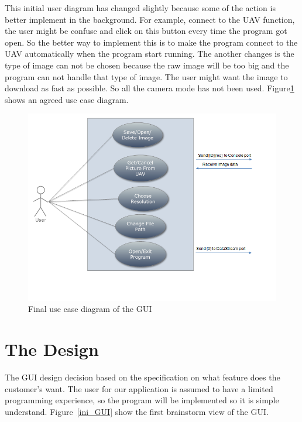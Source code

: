 This initial user diagram has changed slightly because some of the action is better implement in the background. For example, connect to the UAV function, the user might be confuse and click on this button every time the program got open. So the better way to implement this is to make the program connect to the UAV automatically when the program start running. 
The another changes is the type of image can not be chosen because the raw image will be too big and the program can not handle that type of image.
The user might want the image to download as fast as possible. So all the camera mode has not been used.
Figure\ref{GUI_finalUseCase} shows an agreed use case diagram. 

\begin{figure}[!hbtp]
\begin{center}
\includegraphics[scale=0.7]{figures/FinaluserCase.png} 
\end{center}
\caption{Final use case diagram of the GUI\label{GUI_finalUseCase}}
\end{figure}



\section{The Design}

The GUI design decision based on the specification on what feature does the customer’s want. 
The user for our application is assumed to have a limited programming experience, so the program will be implemented so it is simple understand. Figure~\ref{ini_GUI} show the first brainstorm view of the GUI. 

